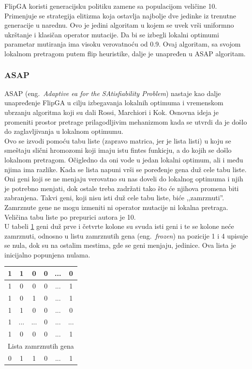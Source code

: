 \documentclass[a4paper]{article}
\begin{document}
FlipGA koristi generacijsku politiku zamene sa populacijom veličine 10.
Primenjuje se strategija elitizma koja ostavlja najbolje dve jedinke iz trenutne generacije 
u narednu. Ovo je jedini algoritam u kojem se uvek vrši uniformno ukrštanje i klasičan operator mutacije. Da bi se izbegli lokalni optimumi parametar mutiranja 
ima visoku verovatnoću od 0.9. 
Ovaj algoritam, sa svojom lokalnom pretragom putem flip heuristike,
dalje je unapređen u ASAP algoritam.


\subsubsection{ASAP}
\label{sec:ea_asap}
ASAP (eng.~{\em Adaptive ea for the SAtisfi­ability Problem}) \cite{adaptiveEA, ea_with_table} nastaje kao dalje unapređenje FlipGA u cilju izbegavanja lokalnih optimuma
i vremenskom ubrzanju algoritma koji su dali Rossi, Marchiori i Kok. 
Osnovna ideja je promeniti prostor pretrage prilagodljivim mehanizmom 
kada se utvrdi da je došlo do zaglavljivanja u lokalnom optimumu. \\

Ovo se izvodi pomoću tabu liste (zapravo matrica, jer je lista listi) 
u koju se smeštaju slični hromozomi koji imaju
istu fintes funkicju, a do kojih se došlo lokalnom pretragom. Očigledno da oni vode u
jedan lokalni optimum, ali i među njima ima razlike. Kada se lista napuni vrši se poređenje
gena duž cele tabu liste.
Oni geni koji se ne menjaju verovatno su nas doveli do lokalnog optimuma 
i njih je potrebno menjati, dok ostale treba
zadržati tako što će njihova promena biti zabranjena. Takvi geni, koji nisu isti duž cele
tabu liste, biće ,,zamrznuti''. Zamrznute gene ne mogu izmeniti ni operator mutacije
ni lokalna pretraga. Veličina tabu liste po prepurici autora je 10.\\

U tabeli \ref{tab:ea_tabu_list} geni duž prve i četvrte kolone su svuda isti geni i te
se kolone neće zamrznuti, odnosno u listu zamrznutih gena (eng.~{\em frozen}) na pozicije 1 i 4 upisuje se
nula, dok su na ostalim mestima, gde se geni menjaju, jedinice. 
Ova lista je inicijalno popunjena nulama.

\begin{table}[h!]
\centering
{}\label{tab:ea_tabu_list} 
\begin{tabular}{|*{6}{c|}}
 \hline
  1 & 1 & 0 & 0 & ... & 0 \\ \hline
  1 & 0 & 0 & 0 & ... & 1 \\ \hline
  1 & 0 & 1 & 0 & ... & 1 \\ \hline
  1 & 1 & 0 & 0 & ... & 0 \\ \hline
  1 & ... & ... & 0 & ... & ... \\ \hline
  1 & 0 & 0 & 0 & ... & 1 \\ \hline \hline
  \multicolumn{6}{|c|}{Lista zamrznutih gena} \\ \hline
  0 & 1 & 1 & 0 & ... & 1 \\ \hline
\end{tabular}
\end{table}
\end{document}
